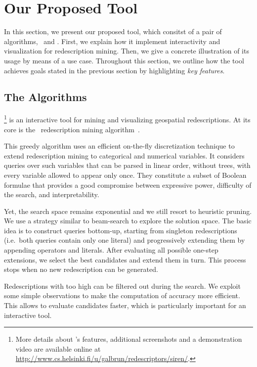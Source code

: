 \section{Our Proposed Tool}
In this section, we present our proposed tool, which consitst of a pair of
algorithms, \ReReMi\ and \Siren. First, we explain how it implement
interactivity and visualization for redescription mining.  Then, we
give a concrete illustration of its usage by means of a
use case. Throughout this section, we outline how the tool achieves
goals stated in the previous section by highlighting \emph{key features}.

\subsection{The Algorithms}
\label{sec:algorithms}

\Siren\footnote{More details about \Siren's features, additional
  screenshots and a demonstration video are available online at
  \url{http://www.cs.helsinki.fi/u/galbrun/redescriptors/siren/}.}  is
an interactive tool for mining and visualizing geospatial
redescriptions. At its core is the \ReReMi\ redescription mining
algorithm~\cite{galbrun11black,galbrun12black}.

This greedy algorithm
uses an efficient on-the-fly discretization technique to extend
redescription mining to categorical and numerical variables.
It considers queries over such variables that can be parsed in linear
order, without trees, with every variable allowed to appear only once.
They constitute a subset of Boolean formulae that
provides a good compromise between expressive power, difficulty of the
search, and interpretability.

Yet, the search space remains exponential and we still resort to
heuristic pruning.  We use a strategy similar to
beam-search to explore the solution space.  The basic idea is to
construct queries bottom-up, starting from singleton redescriptions
(i.e.\ both queries contain only one literal) and progressively
extending them by appending operators and
literals. %
After evaluating all possible one-step extensions, we select the best
candidates and extend them in turn. This process stops when no new
redescription can be generated.

Redescriptions with too high \pValue{} can be filtered out during the search.
We exploit some simple observations to make the computation of
accuracy more efficient. This allows to evaluate candidates faster,
which is particularly important for an interactive tool.  

